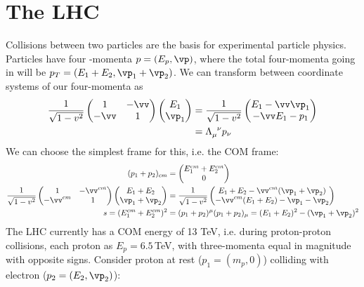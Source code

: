 \documentclass[relqm.tex]{subfiles}
\begin{document}
\chapter{The LHC}
Collisions between two particles are the basis for experimental particle physics. 
Particles have four -momenta $p=(E_p,\vp)$, where the total four-momenta going in will be $p_T=(E_1+E_2,\vp_1+\vp_2)$.
We can transform between coordinate systems of our four-momenta as
\begin{align}
    \frac{1}{\sqrt{1-v^2}}\begin{pmatrix}1& -\vv \\ -\vv & 1\end{pmatrix}\begin{pmatrix} E_1 \\ \vp_1\end{pmatrix} &= \frac{1}{\sqrt{1-v^2}}\begin{pmatrix} E_1-\vv\vp_1 \\ -\vv E_1 - p_1\end{pmatrix} \\
                                          &= \tensor{\Lambda}{_\mu^\nu}p_\nu
\end{align}
We can choose the simplest frame for this, i.e. the COM frame:
\begin{align}
    (p_1+p_2)_{cm} &= \begin{pmatrix} E_1^{cm} + E_2^{cm} \\ 0 \end{pmatrix} \\
    \frac{1}{\sqrt{1-v^2}}\begin{pmatrix}1& -\vv^{cm} \\ -\vv^{cm} & 1\end{pmatrix}\begin{pmatrix} E_1 + E_2 \\ \vp_1 + \vp_2\end{pmatrix} &= \frac{1}{\sqrt{1-v^2}}\begin{pmatrix} E_1 + E_2 -\vv^{cm}(\vp_1+\vp_2) \\ -\vv^{cm}( E_1+E_2) - \vp_1-\vp_2\end{pmatrix}  \\
    s = (E_1^{cm}+E_2^{cm})^2 &= (p_1+p_2)^\mu(p_1+p_2)_\mu = (E_1+E_2)^2 - (\vp_1+\vp_2)^2
\end{align}
The LHC currently has a COM energy of 13 TeV, i.e. during proton-proton collisions, each proton as $E_p=6.5\,$TeV, with three-momenta equal in magnitude with opposite signs. 
Consider proton at rest ($p_1=(m_p,0)$) colliding with electron ($p_2=(E_2,\vp_2)$):
\end{document}
